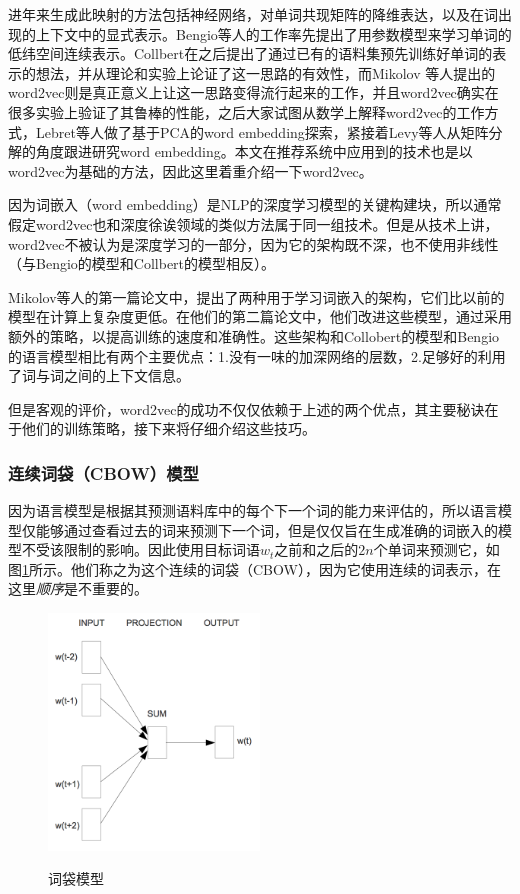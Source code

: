 进年来生成此映射的方法包括神经网络\cite{BengioDV00,CollobertW08,mikolov2013distributed}，对单词共现矩阵的降维表达\cite{MFw2v,PCAw2v,EMFw2v}，以及在词出现的上下文中的显式表示\cite{levy2014linguistic}。Bengio等人的工作\cite{BengioDV00}率先提出了用参数模型来学习单词的低纬空间连续表示。Collbert\cite{CollobertW08}在之后提出了通过已有的语料集预先训练好单词的表示的想法，并从理论和实验上论证了这一思路的有效性，而Mikolov 等人提出的word2vec\cite{mikolov2013distributed}则是真正意义上让这一思路变得流行起来的工作，并且word2vec确实在很多实验上验证了其鲁棒的性能，之后大家试图从数学上解释word2vec的工作方式，Lebret等人做了基于PCA\cite{PCAw2v}的word embedding探索，紧接着Levy等人\cite{MFw2v}从矩阵分解的角度跟进研究word embedding。本文在推荐系统中应用到的技术也是以word2vec为基础的方法，因此这里着重介绍一下word2vec。

因为词嵌入（word embedding）是NLP的深度学习模型的关键构建块，所以通常假定word2vec也和深度徐诶领域的类似方法属于同一组技术。但是从技术上讲，word2vec不被认为是深度学习的一部分，因为它的架构既不深，也不使用非线性（与Bengio的模型\cite{BengioDV00}和Collbert的模型\cite{CollobertW08}相反）。

Mikolov等人的第一篇论文\cite{word2vec}中，提出了两种用于学习词嵌入的架构，它们比以前的模型在计算上复杂度更低。在他们的第二篇论文\cite{mikolov2013distributed}中，他们改进这些模型，通过采用额外的策略，以提高训练的速度和准确性。这些架构和Collobert的模型和Bengio的语言模型相比有两个主要优点：1.没有一味的加深网络的层数，2.足够好的利用了词与词之间的上下文信息。

但是客观的评价，word2vec的成功不仅仅依赖于上述的两个优点，其主要秘诀在于他们的训练策略，接下来将仔细介绍这些技巧。
\subsubsection{连续词袋（CBOW）模型}
因为语言模型是根据其预测语料库中的每个下一个词的能力来评估的，所以语言模型仅能够通过查看过去的词来预测下一个词，但是仅仅旨在生成准确的词嵌入的模型不受该限制的影响。因此使用目标词语$w_t$之前和之后的$2n$个单词来预测它，如图\ref{fig:cbow}所示。他们称之为这个连续的词袋（CBOW），因为它使用连续的词表示，在这里\emph{顺序}是不重要的。
   \begin{figure}[h]
\centering
  \includegraphics[width=0.5\textwidth]{./graph/cbow.png}\\
  \caption{词袋模型\cite{word2vec}}\label{fig:cbow}
\end{figure} 

